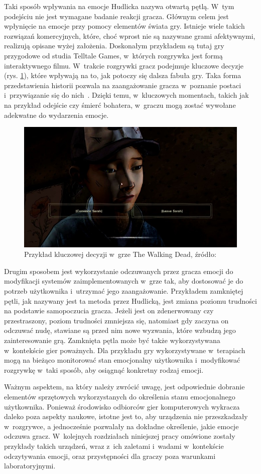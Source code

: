 Taki sposób wpływania na emocje Hudlicka nazywa otwartą pętlą. W~tym podejściu nie jest wymagane badanie reakcji gracza. Głównym celem jest wpłynięcie na emocje przy pomocy elementów świata gry. Istnieje wiele takich rozwiązań komercyjnych, które, choć wprost nie są nazywane grami afektywnymi, realizują opisane wyżej założenia. Doskonałym przykładem są tutaj gry przygodowe od studia Telltale Games, w~których rozgrywka jest formą interaktywnego filmu. W~trakcie rozgrywki gracz podejmuje kluczowe decyzje (rys. \ref{fig:walking_dead}), które wpływają na to, jak potoczy się dalsza fabuła gry. Taka forma przedstawienia historii pozwala na zaangażowanie gracza w~poznanie postaci i~przywiązanie się do nich~\cite{games_for_empathy}. Dzięki temu, w~kluczowych momentach, takich jak na przykład odejście czy śmierć bohatera, w~graczu mogą zostać wywołane adekwatne do wydarzenia emocje.
\begin{figure}
	\centering
	\includegraphics[width=0.7\linewidth]{images/walking_dead_decision.jpg}
	\caption{Przykład kluczowej decyzji w~grze The Walking Dead, źródło:~\cite{the_walking_dead}}
	\label{fig:walking_dead}
\end{figure}

Drugim sposobem jest wykorzystanie odczuwanych przez gracza emocji do modyfikacji systemów zaimplementowanych w~grze tak, aby dostosować je do potrzeb użytkownika i~utrzymać jego zaangażowanie. Przykładem zamkniętej pętli, jak nazywany jest ta metoda przez Hudlicką, jest zmiana poziomu trudności na podstawie samopoczucia gracza. Jeżeli jest on zdenerwowany czy przestraszony, poziom trudności zmniejsza się, natomiast gdy zaczyna on odczuwać nudę, stawiane są przed nim nowe wyzwania, które wzbudzą jego zainteresowanie grą. Zamknięta pętla może być także wykorzystywana w~kontekście gier poważnych. Dla przykładu gry wykorzystywane w~terapiach mogą na bieżąco monitorować stan emocjonalny użytkownika i~modyfikować rozgrywkę w~taki sposób, aby osiągnąć konkretny rodzaj emocji.

Ważnym aspektem, na który należy zwrócić uwagę, jest odpowiednie dobranie elementów sprzętowych wykorzystanych do określenia stanu emocjonalnego użytkownika. Ponieważ środowisko odbiorców gier komputerowych wykracza daleko poza aspekty naukowe, istotne jest to, aby urządzenia nie przeszkadzały w~rozgrywce, a jednocześnie pozwalały na dokładne określenie, jakie emocje odczuwa gracz. W~kolejnych rozdziałach niniejszej pracy omówione zostały przykłady takich urządzeń, wraz z~ich zaletami i~wadami w~kontekście odczytywania emocji, oraz przystępności dla graczy poza warunkami laboratoryjnymi.

